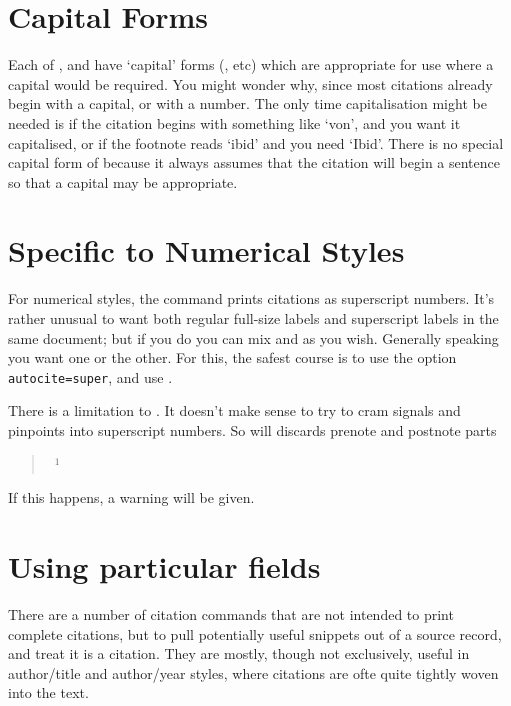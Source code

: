 \section{Capital Forms}

 Each of ,
 and  have `capital' forms (, etc)
which are appropriate for use where a capital would be required. You
might wonder why, since most citations already begin with a capital,
or with a number. The only time capitalisation might be needed is if
the citation begins with something like `von', and you want it
capitalised, or if the footnote reads `ibid' and you need
`Ibid'. There is no special capital form of  because it
always assumes that the citation will begin a sentence so that a
capital may be appropriate.  

\section{Specific to Numerical Styles}

For numerical styles, the command  prints citations as
superscript numbers. It’s rather unusual to want both regular
full-size labels and superscript labels in the same document; but if
you do you can mix  and  as you wish. Generally
speaking you want one or the other. For this, the safest course is to
use the option \texttt{autocite=super}, and use .

There is a limitation to . It doesn't make sense to try
to cram signals and pinpoints into superscript numbers. So
 will discards prenote and postnote parts
\begin{quote}
 \gives\ $^1$
\end{quote}
If this happens, a warning will be given.

\section{Using particular fields}

There are a number of citation commands that are not intended to print
complete citations, but to pull potentially useful snippets out of a
source record, and treat it is a citation. They are mostly, though not
exclusively, useful in author/title and author/year styles, where
citations are ofte quite tightly woven into the text.

